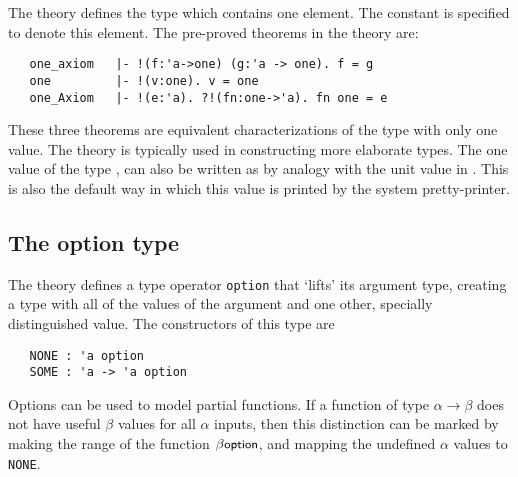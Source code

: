 The theory  defines  the type   which  contains one element.
The constant    is specified  to denote  this element.   The pre-proved
theorems in the theory  are:

\begin{hol}
\begin{verbatim}
   one_axiom   |- !(f:'a->one) (g:'a -> one). f = g
   one         |- !(v:one). v = one
   one_Axiom   |- !(e:'a). ?!(fn:one->'a). fn one = e
\end{verbatim}
\end{hol}

\noindent These three theorems are equivalent characterizations of the type
with only one value. The theory  is typically used in
constructing more elaborate types.  The one value of the type
, can also be written as \ml{()} by analogy with the unit
value in \ML.  This is also the default way in which this value is
printed by the system pretty-printer.

\subsection{The option type}

The theory  defines a type operator \verb+option+
that `lifts' its argument type, creating a type with all of the
values of the argument and one other, specially distinguished value.
The constructors of this type are
\begin{verbatim}
   NONE : 'a option
   SOME : 'a -> 'a option
\end{verbatim}
Options can be used to model partial functions.  If a function of type
$\alpha\rightarrow\beta$ does not have useful $\beta$ values for all
$\alpha$ inputs, then this distinction can be marked by making the
range of the function $\beta\mbox{\small{\textbf{\sf{option}}}}$, and mapping the
undefined $\alpha$ values to {\small\verb+NONE+}.

